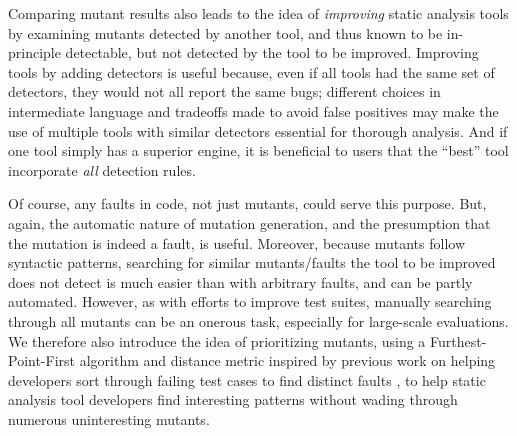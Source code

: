 Comparing mutant results also leads to the idea of \emph{improving} static analysis tools by examining mutants detected by another tool, and thus known to be in-principle detectable, but not detected by the tool to be improved.  Improving tools by adding detectors is useful because, even if all tools had the same set of detectors, they would not all report the same bugs; different choices in intermediate language and tradeoffs made to avoid false positives may make the use of multiple tools with similar detectors essential for thorough analysis.  And if one tool simply has a superior engine, it is beneficial to users that the ``best'' tool incorporate \emph{all} detection rules.

Of course, any faults in code, not just mutants, could serve this purpose.  But, again, the automatic nature of mutation generation, and the presumption that the mutation is indeed a fault, is useful.  Moreover, because mutants follow syntactic patterns, searching for similar mutants/faults the tool to be improved does not detect is much easier than with arbitrary faults, and can be partly automated.   However, as with efforts to improve test suites, manually searching through all mutants can be an onerous task, especially for large-scale evaluations.  We therefore also introduce the idea of prioritizing mutants, using a Furthest-Point-First \cite{Gonzalez} algorithm and distance metric inspired by previous work on helping developers sort through failing test cases to find distinct faults \cite{PLDI13,distMut}, to help static analysis tool developers find interesting patterns without wading through numerous uninteresting mutants.

